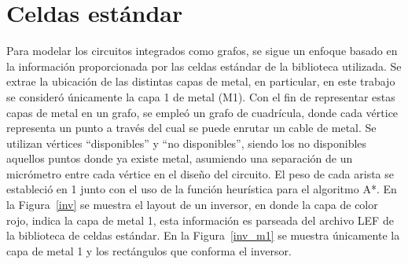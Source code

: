 \documentclass[reprint,amsmath,amssymb,aps]{revtex4-2}
\begin{document}
\section{Celdas estándar}
Para modelar los circuitos integrados como grafos, se sigue un enfoque basado en la información proporcionada por las celdas estándar de la biblioteca utilizada. Se extrae la ubicación de las distintas capas de metal, en particular, en este trabajo se consideró únicamente la capa 1 de metal (M1). Con el fin de representar estas capas de metal en un grafo, se empleó un grafo de cuadrícula, donde cada vértice representa un punto a través del cual se puede enrutar un cable de metal. Se utilizan vértices ``disponibles'' y ``no disponibles'', siendo los no disponibles aquellos puntos donde ya existe metal, asumiendo una separación de un micrómetro entre cada vértice en el diseño del circuito. El peso de cada arista se estableció en 1 junto con el uso de la función heurística para el algoritmo A*. En la Figura~\ref{inv} se muestra el layout de un inversor, en donde la capa de color rojo, indica la capa de metal 1, esta información es parseada del archivo LEF de la biblioteca de celdas estándar. En la Figura~\ref{inv_m1} se muestra únicamente la capa de metal 1 y los rectángulos que conforma el inversor.
\end{document}
